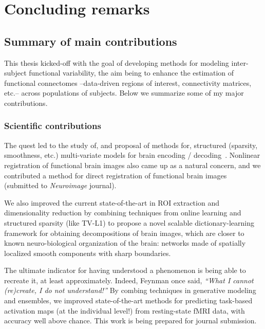 \chapter{\;\;Concluding remarks}\label{chap:conclusion}

\minitoc

\section{Summary of main contributions}
This thesis kicked-off with the goal of developing methods for modeling inter-subject
functional variability, the aim being to enhance the estimation of functional connectomes
--data-driven regions of interest, connectivity matrices, etc.--
across populations of subjects. Below we summarize some of my major contributions.

\subsection{Scientific contributions}
The quest led to the study of, and proposal of methods for, structured (sparsity, smoothness, etc.) multi-variate models for brain encoding / decoding~\citep{dohmatob2015speeding,abrahamregion,eickenberg2015total,pelle2016multivariate}. Nonlinear registration of functional brain images also came up as a natural concern, and we contributed a method for direct registration of functional brain images~\citep{dohmatob2016epi2epi} (submitted to \textit{Neuroimage} journal).

We also improved the current state-of-the-art in ROI extraction and dimensionality reduction by combining techniques from online learning and structured sparsity (like TV-L1) to propose a novel scalable dictionary-learning framework for obtaining decompositions of brain images, which are closer to known neuro-biological organization of the brain: networks made of spatially localized smooth components with sharp boundaries.

The ultimate indicator for having understood a phenomenon is being able to recreate it, at least approximately. Indeed, Feynman once said, \textit{``What I cannot (re)create, I do not understand!''} By combing techniques in generative modeling and ensembles, we improved state-of-the-art methods for predicting task-based activation maps (at the individual level!) from resting-state fMRI data, with accuracy well above chance.
This work is being prepared for journal submission.

